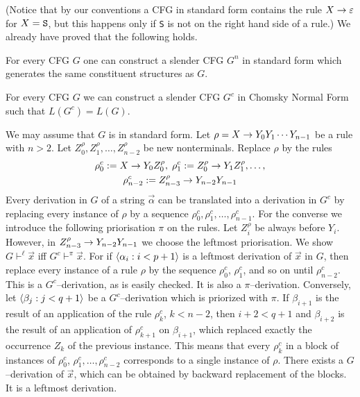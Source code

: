 (Notice that by our conventions a CFG in
standard form contains the rule $X \rightarrow \varepsilon$  for
$X = \mbox{\tt S}$, but this happens only if {\tt S} is not on the
right hand side of a rule.) We already have proved that
the following holds.
\begin{thm}
For every CFG $G$ one can construct a slender
CFG $G^n$ in standard form which generates
the same constituent structures as $G$.
\end{thm}
\begin{thm}
For every CFG $G$ we can construct a slender
CFG $G^c$ in Chomsky Normal Form such that
$L(G^c) = L(G)$.
\end{thm}
\proofbeg
We may assume that $G$ is in standard form.
Let $\rho = X \rightarrow Y_0 Y_1 \dotsb Y_{n-1}$ be a rule with $n > 2$.
Let $Z^{\rho}_0, Z^{\rho}_1, \dotsc, Z^{\rho}_{n-2}$
be new nonterminals. Replace $\rho$ by the rules
\begin{multline}
\rho^c_0 := X \rightarrow Y_0 Z^{\rho}_0, \;
\rho^c_1 := Z^{\rho}_0 \rightarrow Y_1 Z^{\rho}_1, 
\dotsc,  \\
\rho^c_{n-2} := Z^{\rho}_{n-3} \rightarrow Y_{n-2} Y_{n-1}
\end{multline}
Every derivation in $G$ of a string $\vec{\alpha}$ can be
translated into a derivation in $G^c$ by replacing every
instance of $\rho$ by a sequence $\rho^c_0, \rho^c_1, \dotsc, %
\rho^c_{n-1}$. For the converse we introduce the following
priorisation $\pi$ on the rules. Let $Z_i^{\rho}$ be always
before $Y_i$. However, in $Z_{n-3}^{\rho} \rightarrow Y_{n-2} Y_{n-1}$
we choose the leftmost priorisation. We show $G \vdash^{\ell}
\vec{x}$ iff $G^c \vdash^{\pi} \vec{x}$.
For if $\langle \alpha_i : i < p+1\rangle$ is a leftmost
derivation of $\vec{x}$ in $G$, then replace every
instance of a rule $\rho$ by the sequence $\rho^c_0$,
$\rho^c_1$, and so on until $\rho^c_{n-2}$.
This is a $G^c$--derivation, as is easily checked.
It is also a $\pi$--derivation. Conversely, let
$\langle \beta_j : j < q+1\rangle$ be a $G^c$--derivation
which is priorized with $\pi$. If $\beta_{i+1}$ is the
result of an application of the rule $\rho^c_k$,
$k < n-2$, then $i +2 < q+1$ and $\beta_{i+2}$ is the
result of an application of $\rho^c_{k+1}$ on $\beta_{i+1}$,
which replaced exactly the occurrence $Z_k$ of the previous
instance. This means that every $\rho^c_k$ in a block
of instances of $\rho^c_0$, $\rho^c_1, \dotsc, \rho^c_{n-2}$ 
corresponds to a single instance of $\rho$. There exists a 
$G$--derivation of $\vec{x}$, which can be obtained
by backward replacement of the blocks. It is a leftmost
derivation.
\proofend

